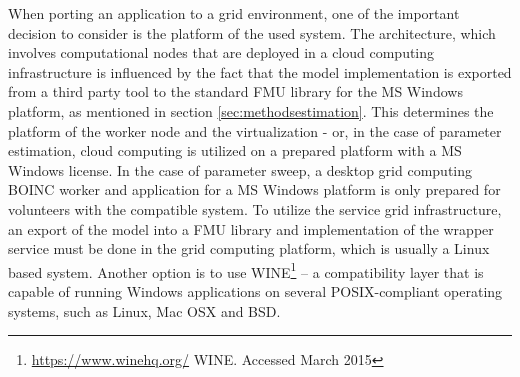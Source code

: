%
%


When porting an application to a grid environment, one of the important decision to consider is the platform of the used system. The architecture, which involves computational nodes that are deployed in a cloud computing infrastructure is influenced by the fact that the model implementation is exported from a third party tool to the standard FMU library for the MS Windows platform, as mentioned in section \ref{sec:methodsestimation}. This determines the platform of the worker node and the virtualization - or, in the case of parameter estimation, cloud computing is utilized on a prepared platform with a MS Windows license. In the case of parameter sweep, a desktop grid computing BOINC worker and application for a MS Windows platform is only prepared for volunteers with the compatible system. To utilize the service grid infrastructure, an export of the model into a FMU library and implementation of the wrapper service must be done in the grid computing platform,  which is usually a Linux based system. Another option is to use WINE\footnote{\url{https://www.winehq.org/} WINE. Accessed March 2015} -- a compatibility layer that is capable of running Windows applications on several POSIX-compliant operating systems, such as Linux, Mac OSX and BSD. 

